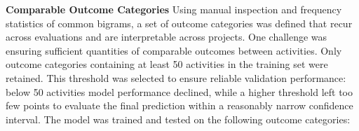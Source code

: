 \documentclass[12pt,a4paper]{article}
\begin{document}
\textbf{Comparable Outcome Categories}
Using manual inspection and frequency statistics of common bigrams, a set of outcome categories was defined that recur across evaluations and are interpretable across projects. One challenge was ensuring sufficient quantities of comparable outcomes between activities. Only outcome categories containing at least 50 activities in the training set were retained. This threshold was selected to ensure reliable validation performance: below 50 activities model performance declined, while a higher threshold left too few points to evaluate the final prediction within a reasonably narrow confidence interval. The model was trained and tested on the following outcome categories:
\begin{itemize}[noitemsep,topsep=0pt]

\end{itemize}
\end{document}
